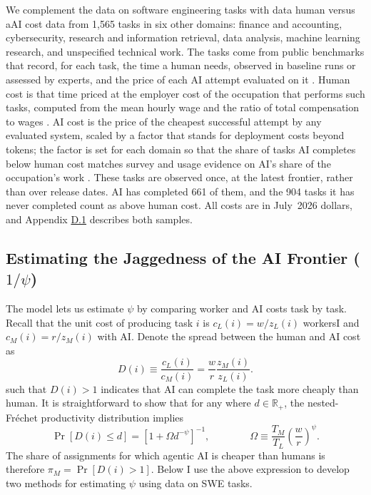 \documentclass[11pt]{article}
\begin{document}
We complement the data on software engineering tasks with data human
versus aAI cost data from 1{,}565 tasks in six other domains:
finance and accounting, cybersecurity, research and information retrieval, data analysis, machine learning research, and unspecified technical work. The tasks come from public benchmarks that
record, for each task, the time a human needs, observed in baseline
runs or assessed by experts, and the price of each AI attempt evaluated
on it \citep{metr2026timehorizon,olariu2026rofinllm,lyptus2026cyber,mialon2023gaia,patronus2025trail}.
Human cost is that time priced at the employer cost of the occupation
that performs such tasks, computed from the mean hourly wage and the
ratio of total compensation to wages \citep{bls2026oews,bls2026ecec}.
AI cost is the price of the cheapest successful attempt by any evaluated
system, scaled by a factor that stands for deployment costs beyond
tokens; the factor is set for each domain so that the share of tasks
AI completes below human cost matches survey and usage evidence on
AI's share of the occupation's work \citep{epochpolling2026,massenkoffmccrory2026labor,onet2026}.
These tasks are observed once, at the latest frontier, rather than
over release dates. AI has completed 661 of
them, and the 904 tasks it has never completed
count as above human cost. All costs are in July~2026 dollars,
and Appendix \href{https://ahmadlp.github.io/Lashkaripour_AI_Displacement_Online_Appendix.pdf\#page=101}{D.1} describes both samples.

\subsection{Estimating the Jaggedness of the AI Frontier ($1/\psi$)}

The model lets us estimate $\psi$ by comparing worker and AI costs
task by task. Recall that the unit cost of producing task $i$ is
$c_{L}(i)=w/z_{L}(i)$ workersI and $c_{M}(i)=r/z_{M}(i)$ with AI.
Denote the spread between the human and AI cost as
\begin{equation}
D(i)\equiv\frac{c_{L}(i)}{c_{M}(i)}=\frac{w}{r}\frac{z_{M}(i)}{z_{L}(i)}.\label{eq:measured-cost-advantage}
\end{equation}
such that $D(i)>1$ indicates that AI can complete the task more cheaply
than human. It is straightforward to show that for any where $d\in\mathds{R}_{+}$,
the nested-Fréchet productivity distribution implies
\begin{equation}
\Pr[D(i)\leq d]=\left[1+\Omega d^{-\psi}\right]^{-1},\qquad\qquad\Omega\equiv\frac{T_{M}}{T_{L}}\left(\frac{w}{r}\right)^{\psi}.\label{eq:measurement-cost-advantage-cdf}
\end{equation}
The share of assignments for which agentic AI is cheaper than humans
is therefore $\pi_{M}=\Pr[D(i)>1]$. Below I use the above expression
to develop two methods for estimating $\psi$ using data on SWE tasks.
\end{document}
